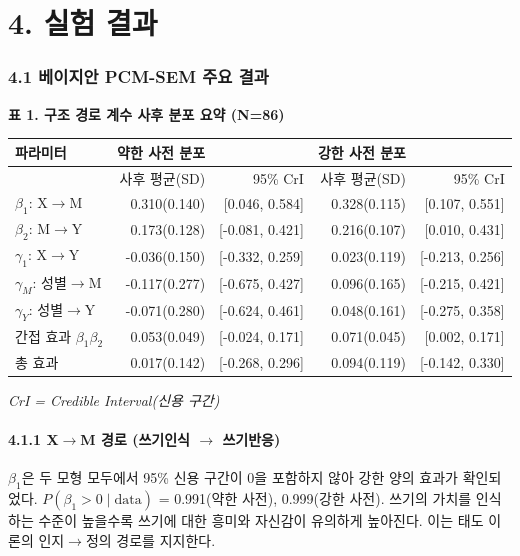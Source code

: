 \documentclass[a4paper,10pt]{oblivoir}
\begin{document}
\section{4. 실험 결과}

\subsubsection{4.1 베이지안 PCM-SEM 주요 결과}


\noindent\textbf{표 1. 구조 경로 계수 사후 분포 요약 (N=86)}


\begin{table}[htbp]
\centering
\small
\begin{tabular}{lrrrr}
\toprule
파라미터 & 약한 사전 분포 &  & 강한 사전 분포 &  \\
\midrule
 & 사후 평균(SD) & 95\% CrI & 사후 평균(SD) & 95\% CrI \\
$\beta_1$: X\ensuremath{\rightarrow}M & 0.310(0.140) & [0.046, 0.584] & 0.328(0.115) & [0.107, 0.551] \\
$\beta_2$: M\ensuremath{\rightarrow}Y & 0.173(0.128) & [-0.081, 0.421] & 0.216(0.107) & [0.010, 0.431] \\
$\gamma_1$: X\ensuremath{\rightarrow}Y & -0.036(0.150) & [-0.332, 0.259] & 0.023(0.119) & [-0.213, 0.256] \\
$\gamma_M$: 성별\ensuremath{\rightarrow}M & -0.117(0.277) & [-0.675, 0.427] & 0.096(0.165) & [-0.215, 0.421] \\
$\gamma_Y$: 성별\ensuremath{\rightarrow}Y & -0.071(0.280) & [-0.624, 0.461] & 0.048(0.161) & [-0.275, 0.358] \\
간접 효과 $\beta_1\beta_2$ & 0.053(0.049) & [-0.024, 0.171] & 0.071(0.045) & [0.002, 0.171] \\
총 효과 & 0.017(0.142) & [-0.268, 0.296] & 0.094(0.119) & [-0.142, 0.330] \\
\bottomrule
\end{tabular}
\end{table}

\textit{CrI = Credible Interval(신용 구간)}

\paragraph{4.1.1 X\ensuremath{\rightarrow}M 경로 (쓰기인식 \ensuremath{\rightarrow} 쓰기반응)}

$\beta_1$은 두 모형 모두에서 95\% 신용 구간이 0을 포함하지 않아 강한 양의 효과가 확인되었다. $P(\beta_1 > 0 \mid \text{data})$ = 0.991(약한 사전), 0.999(강한 사전). 쓰기의 가치를 인식하는 수준이 높을수록 쓰기에 대한 흥미와 자신감이 유의하게 높아진다. 이는 태도 이론의 인지\ensuremath{\rightarrow}정의 경로를 지지한다.
\end{document}
